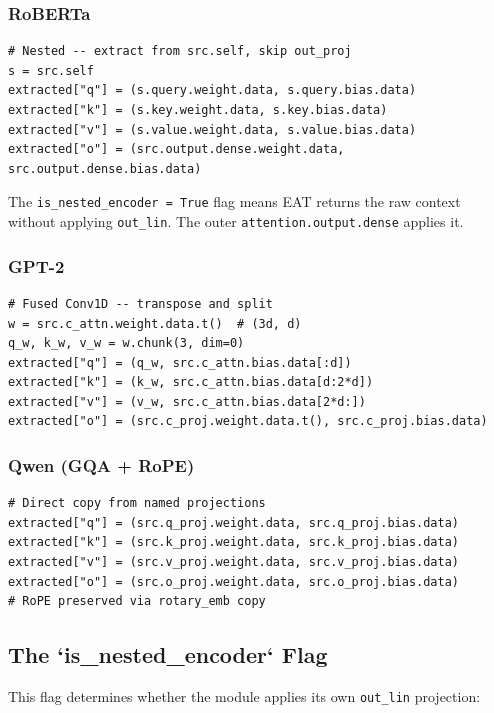\subsubsection{RoBERTa}

\begin{lstlisting}
# Nested -- extract from src.self, skip out_proj
s = src.self
extracted["q"] = (s.query.weight.data, s.query.bias.data)
extracted["k"] = (s.key.weight.data, s.key.bias.data)
extracted["v"] = (s.value.weight.data, s.value.bias.data)
extracted["o"] = (src.output.dense.weight.data, src.output.dense.bias.data)
\end{lstlisting}

The \texttt{is\_nested\_encoder = True} flag means EAT returns the raw context 
without applying \texttt{out\_lin}. The outer \texttt{attention.output.dense} applies it.

\subsubsection{GPT-2}

\begin{lstlisting}
# Fused Conv1D -- transpose and split
w = src.c_attn.weight.data.t()  # (3d, d)
q_w, k_w, v_w = w.chunk(3, dim=0)
extracted["q"] = (q_w, src.c_attn.bias.data[:d])
extracted["k"] = (k_w, src.c_attn.bias.data[d:2*d])
extracted["v"] = (v_w, src.c_attn.bias.data[2*d:])
extracted["o"] = (src.c_proj.weight.data.t(), src.c_proj.bias.data)
\end{lstlisting}

\subsubsection{Qwen (GQA + RoPE)}

\begin{lstlisting}
# Direct copy from named projections
extracted["q"] = (src.q_proj.weight.data, src.q_proj.bias.data)
extracted["k"] = (src.k_proj.weight.data, src.k_proj.bias.data)
extracted["v"] = (src.v_proj.weight.data, src.v_proj.bias.data)
extracted["o"] = (src.o_proj.weight.data, src.o_proj.bias.data)
# RoPE preserved via rotary_emb copy
\end{lstlisting}

\subsection{The `is\_nested\_encoder` Flag}

This flag determines whether the module applies its own \texttt{out\_lin} projection:

